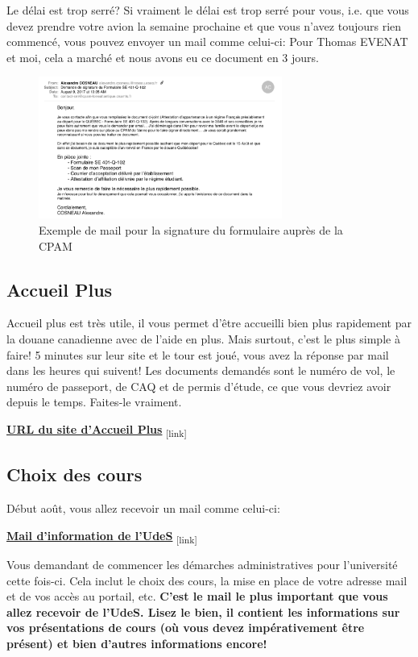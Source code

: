  \begin{example}{Le délai est trop serré?}
   Si vraiment le délai est trop serré pour vous, i.e. que vous devez prendre votre avion la semaine prochaine et que vous n'avez toujours rien commencé, vous pouvez envoyer un mail comme celui-ci:
   Pour Thomas EVENAT et moi, cela a marché et nous avons eu ce document en 3 jours.
 \end{example}

 \begin{figure}[h!]
 \centering
 \includegraphics[width = 80mm]{figures/Mail_CPAM}
 \caption{Exemple de mail pour la signature du formulaire auprès de la CPAM}
 \end{figure}

 \subsection{Accueil Plus}\label{sec:sec3.2.8}
 Accueil plus est très utile, il vous permet d'être accueilli bien plus rapidement par la douane canadienne avec de l'aide en plus. Mais surtout, c'est le plus simple à faire! 5 minutes sur leur site et le tour est joué, vous avez la réponse par mail dans les heures qui suivent!
 Les documents demandés sont le numéro de vol, le numéro de passeport, de CAQ et de permis d’étude, ce que vous devriez avoir depuis le temps.
 Faites-le vraiment.

\bigbreak
\href{http://www.accueilplus.ca/}{\textbf{URL du site d'Accueil Plus}}\textsubscript{  [link]}


\subsection{Choix des cours}\label{sec:sec3.2.9}

Début août, vous allez recevoir un mail comme celui-ci:

\bigbreak
\href{Annexes/Sherbrooke/Mail_Info_UdeS.pdf}{\textbf{Mail d'information de l'UdeS}}\textsubscript{  [link]}
\bigbreak

Vous demandant de commencer les démarches administratives pour l'université cette fois-ci. Cela inclut le choix des cours, la mise en place de votre adresse mail et de vos accès au portail, etc.
\bigbreak
\textbf{C'est le mail le plus important que vous allez recevoir de l'UdeS. Lisez le bien, il contient les informations sur vos présentations de cours (où vous devez impérativement être présent) et bien d'autres informations encore!}

